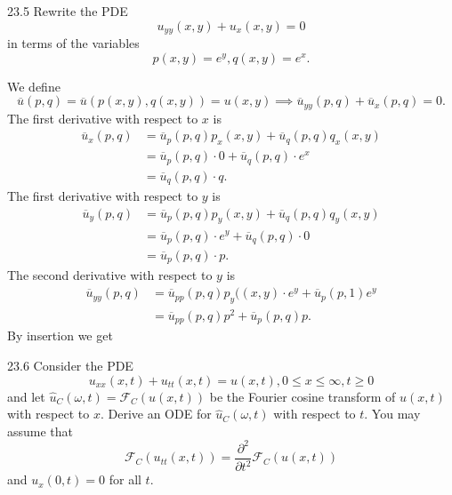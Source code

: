 \begin{problem}{23.5}
  Rewrite the PDE
  \begin{equation*}
    u_{y y}(x,y) + u_x(x,y) = 0
  \end{equation*}
  in terms of the variables
  \begin{equation*}
    p(x,y) = e^{y}, q(x,y) = e^{x}
  .\end{equation*}
\end{problem}

\begin{derivation}
  We define
  \begin{equation*}
    \overline{u}(p,q) = \overline{u}(p(x,y) , q(x,y) ) = u(x,y) \implies \overline{u}_{yy}(p,q) + \overline{u}_x(p,q) = 0
  .\end{equation*}
  The first derivative with respect to $x$ is
  \begin{align*}
    \overline{u}_x(p,q) &= \overline{u}_p(p,q) p_x(x,y) + \overline{u}_q(p,q) q_x(x,y) \\
    &= \overline{u}_p(p,q) \cdot 0 + \overline{u}_q(p,q) \cdot e^{x} \\
    &= \overline{u}_q(p,q) \cdot q
  .\end{align*}
  The first derivative with respect to $y$ is
  \begin{align*}
    \overline{u}_y(p,q) &= \overline{u}_p(p,q) p_y(x,y) + \overline{u}_q(p,q) q_y(x,y) \\
    &= \overline{u}_p(p,q) \cdot e^{y} + \overline{u}_q(p,q) \cdot 0 \\
    &= \overline{u}_p(p,q) \cdot p
  .\end{align*}
  The second derivative with respect to $y$ is
  \begin{align*}
    \overline{u}_{yy}(p,q) &= \overline{u}_{pp}(p,q) p_y((x,y) \cdot e^{y} + \overline{u}_{p} (p,1) e^{y} \\
    &=  \overline{u}_{pp}(p,q) p^2 + \overline{u}_p(p,q) p
  .\end{align*}
  By insertion we get
\end{derivation}


\begin{problem}{23.6}
  Consider the PDE
  \begin{equation*}
    u_{x x}(x,t) + u_{t t}(x,t) = u(x,t), 0 \leq x \leq \infty, t \geq 0
  \end{equation*}
  and let $\hat{u}_C(\omega, t) = \mathcal{F}_C (u(x,t))$ be the Fourier cosine transform of $u(x,t)$ with respect to $x$.
  Derive an ODE for $\hat{u}_C(\omega,t)$ with respect to $t$.
  You may assume that
  \begin{equation*}
    \mathcal{F}_C(u_{t t}(x,t)) = \frac{\partial ^2}{\partial t^2} \mathcal{F}_C \left( u(x,t) \right)
  \end{equation*}
  and $u_x(0,t) = 0$ for all $t$.
\end{problem}

